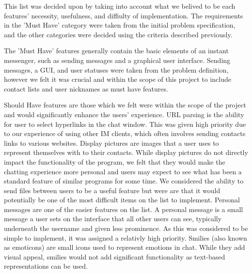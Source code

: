 This list was decided upon by taking into account what we belived to be each features' necessity, usefulness, and diffiulty of implementation. The requirements in the 'Must Have' category were taken from the initial problem specification, and the other categories were decided using the criteria described previously.

The 'Must Have' features generally contain the basic elements of an instant messenger, such as sending messages and a graphical user interface. Sending messages, a GUI, and user statuses were taken from the problem definition, however we felt it was crucial and within the scope of this project to include contact lists and user nicknames as must have features.

Should Have features are those which we felt were within the scope of the project and would significantly enhance the users' experience. URL parsing is the ability for user to select hyperlinks in the chat window. This was given high priority due to our experience of using other IM clients, which often involves sending contacts links to various websites. Display pictures are images that a user uses to represent themselves with to their contacts. While display pictures do not directly impact the functionality of the program, we felt that they would make the chatting experience more personal and users may expect to see what has been a standard feature of similar programs for some time. We considered the ability to send files between users to be a useful feature but were are that it would potentially be one of the most difficult items on the list to implement. Personal messages are one of the easier features on the list. A personal message is a small message a user sets on the interface that all other users can see, typically underneath the username and given less prominence. As this was considered to be simple to implement, it was assigned a relativly high priority. Smilies (also known as emoticons) are small icons used to represent emotions in chat. While they add visual appeal, smilies would not add significant functionality as text-based representations can be used.

